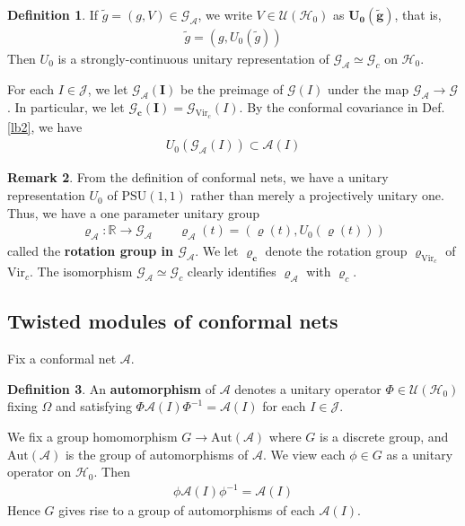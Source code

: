 \documentclass[11pt,b5paper,notitlepage]{article}
\theoremstyle{definition}
\newtheorem{df}{Definition}[section]
\newtheorem{rem}[df]{Remark}
\theoremstyle{plain}
\newcommand{\wtd}{\widetilde}
\newcommand{\PSU}{\mathrm{PSU}(1,1)}
\newcommand{\Vir}{\mathrm{Vir}}
\newcommand{\GA}{\mathscr G_{\mathcal A}}
\newcommand{\Rbb}{\mathbb R}
\newcommand{\Gc}{\mathscr G_c}
\newcommand{\Aut}{\mathrm{Aut}}
\newcommand{\MA}{\mathcal A}
\newcommand{\MH}{\mathcal H}
\newcommand{\MJ}{\mathcal J}
\newcommand{\MU}{\mathcal U}
\newcommand{\SG}{\mathscr G}
\numberwithin{equation}{section}
\begin{document}
\begin{df}
If $\wtd g=(g,V)\in\GA$, we write $V\in\MU(\MH_0)$ as $\pmb{U_0(\wtd g)}$, that is,
\begin{align*}
\wtd g=(g,U_0(\wtd g))
\end{align*}
Then $U_0$ is a strongly-continuous unitary representation of $\GA\simeq\Gc$ on $\MH_0$. 
\end{df}


For each $I\in\MJ$, we let $\pmb{\GA(I)}$ be the preimage of $\SG(I)$ under the map $\GA\rightarrow\SG$. In particular, we let $\pmb{\Gc(I)}=\SG_{\Vir_c}(I)$. By the conformal covariance in Def. \ref{lb2}, we have
\begin{align*}
U_0(\GA(I))\subset\MA(I)
\end{align*}




\begin{rem}\label{lb40}
From the definition of conformal nets, we have a unitary representation $U_0$ of $\PSU$ rather than merely a projectively unitary one. Thus, we have a one parameter unitary group
\begin{align*}
\pmb{\varrho_\MA}:\Rbb\rightarrow\GA\qquad \varrho_\MA(t)=(\varrho(t),U_0(\varrho(t)))
\end{align*}
called the \textbf{rotation group in $\GA$}. We let $\pmb{\varrho_c}$ denote the rotation group $\varrho_{\Vir_c}$ of $\Vir_c$. The isomorphism $\GA\simeq\Gc$ clearly identifies $\varrho_\MA$ with $\varrho_c$.
\end{rem}



\subsection{Twisted modules of conformal nets}

Fix a conformal net $\MA$. 

\begin{df}
An \textbf{automorphism} of $\MA$ denotes a unitary operator $\Phi\in\MU(\MH_0)$ fixing $\Omega$ and satisfying $\Phi\MA(I)\Phi^{-1}=\MA(I)$ for each $I\in\MJ$. 
\end{df}

We fix a group homomorphism $G\rightarrow\Aut(\MA)$ where $G$ is a discrete group, and $\Aut(\MA)$ is the group of automorphisms of $\MA$. We view each $\phi\in G$ as a unitary operator on $\MH_0$. Then
\begin{align*}
\phi\MA(I)\phi^{-1}=\MA(I)
\end{align*}
Hence $G$ gives rise to a group of automorphisms of each $\MA(I)$.
\end{document}
